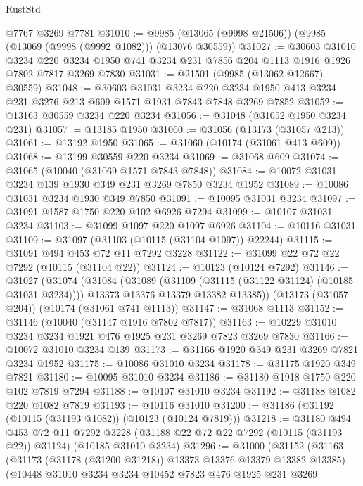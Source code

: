 \begin{lexlean}{RustStd}
\begin{coremodule}
    @7767
    @3269
    @7781
@31010 := @9985 (@13065 (@9998 @21506)) (@9985 (@13069 (@9998 (@9992 @1082))) (@13076 @30559))
@31027 := @30603
    @31010
    @3234
    @220
    @3234
    @1950
    @741
    @3234
    @231
    @7856
    @204
    @1113
    @1916
    @1926
    @7802
    @7817
    @3269
    @7830
@31031 := @21501 (@9985 (@13062 @12667) @30559)
@31048 := @30603
    @31031
    @3234
    @220
    @3234
    @1950
    @413
    @3234
    @231
    @3276
    @213
    @609
    @1571
    @1931
    @7843
    @7848
    @3269
    @7852
@31052 := @13163 @30559 @3234 @220 @3234
@31056 := @31048 (@31052 @1950 @3234 @231)
@31057 := @13185 @1950
@31060 := @31056 (@13173 (@31057 @213))
@31061 := @13192 @1950
@31065 := @31060 (@10174 (@31061 @413 @609))
@31068 := @13199 @30559 @220 @3234
@31069 := @31068 @609
@31074 := @31065 (@10040 (@31069 @1571 @7843 @7848))
@31084 := @10072 @31031 @3234 @139 @1930 @349 @231 @3269 @7850 @3234 @1952
@31089 := @10086 @31031 @3234 @1930 @349 @7850
@31091 := @10095 @31031 @3234
@31097 := @31091 @1587 @1750 @220 @102 @6926 @7294
@31099 := @10107 @31031 @3234
@31103 := @31099 @1097 @220 @1097 @6926
@31104 := @10116 @31031
@31109 := @31097 (@31103 (@10115 (@31104 @1097)) @22244)
@31115 := @31091 @494 @453 @72 @11 @7292 @3228
@31122 := @31099 @22 @72 @22 @7292 (@10115 (@31104 @22))
@31124 := @10123 (@10124 @7292)
@31146 := @31027
    (@31074
      (@31084
        (@31089 (@31109 (@31115 (@31122 @31124) (@10185 @31031 @3234))))
        @13373
        @13376
        @13379
        @13382
        @13385))
    (@13173 (@31057 @204))
    (@10174 (@31061 @741 @1113))
@31147 := @31068 @1113
@31152 := @31146 (@10040 (@31147 @1916 @7802 @7817))
@31163 := @10229 @31010 @3234 @3234 @1921 @476 @1925 @231 @3269 @7823 @3269 @7830
@31166 := @10072 @31010 @3234 @139
@31173 := @31166 @1920 @349 @231 @3269 @7821 @3234 @1952
@31175 := @10086 @31010 @3234
@31178 := @31175 @1920 @349 @7821
@31180 := @10095 @31010 @3234
@31186 := @31180 @1918 @1750 @220 @102 @7819 @7294
@31188 := @10107 @31010 @3234
@31192 := @31188 @1082 @220 @1082 @7819
@31193 := @10116 @31010
@31200 := @31186 (@31192 (@10115 (@31193 @1082)) (@10123 (@10124 @7819)))
@31218 := @31180
    @494
    @453
    @72
    @11
    @7292
    @3228
    (@31188 @22 @72 @22 @7292 (@10115 (@31193 @22)) @31124)
    (@10185 @31010 @3234)
@31296 := @31000
    (@31152
      (@31163
        (@31173 (@31178 (@31200 @31218)) @13373 @13376 @13379 @13382 @13385)
        (@10448
          @31010
          @3234
          @3234
          @10452
          @7823
          @476
          @1925
          @231
          @3269

\end{coremodule}
\end{lexlean}
